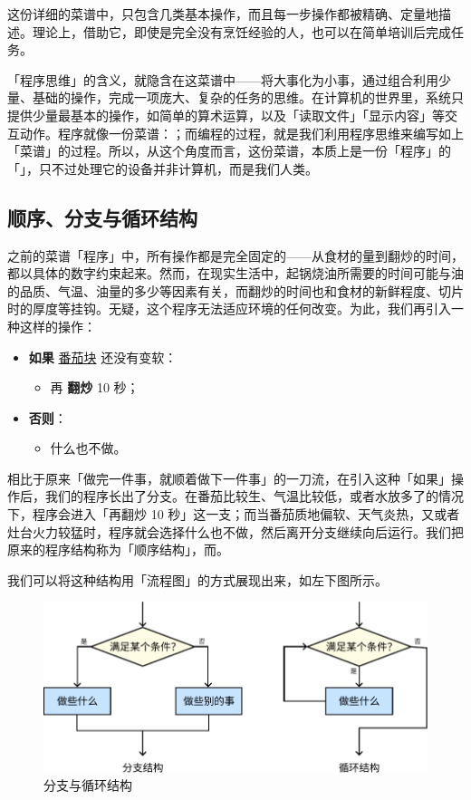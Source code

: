 这份详细的菜谱中，只包含几类基本操作，而且每一步操作都被精确、定量地描述。理论上，借助它，即使是完全没有烹饪经验的人，也可以在简单培训后完成任务。

「程序思维」的含义，就隐含在这菜谱中——将大事化为小事，通过组合利用少量、基础的操作，完成一项庞大、复杂的任务的思维。在计算机的世界里，系统只提供少量最基本的操作，如简单的算术运算，以及「读取文件」「显示内容」等交互动作。程序就像一份菜谱：；而编程的过程，就是我们利用程序思维来编写如上「菜谱」的过程。所以，从这个角度而言，这份菜谱，本质上是一份「程序」的「」，只不过处理它的设备并非计算机，而是我们人类。

\subsection{顺序、分支与循环结构}

之前的菜谱「程序」中，所有操作都是完全固定的——从食材的量到翻炒的时间，都以具体的数字约束起来。然而，在现实生活中，起锅烧油所需要的时间可能与油的品质、气温、油量的多少等因素有关，而翻炒的时间也和食材的新鲜程度、切片时的厚度等挂钩。无疑，这个程序无法适应环境的任何改变。为此，我们再引入一种这样的操作：

\begin{itemize}
  \item \textbf{如果} \underline{番茄块} 还没有变软：
    \begin{itemize}
      \item 再 \textbf{翻炒} 10 秒；
    \end{itemize}
  \item \textbf{否则}：
    \begin{itemize}
      \item 什么也不做。
    \end{itemize}
\end{itemize}

相比于原来「做完一件事，就顺着做下一件事」的一刀流，在引入这种「如果」操作后，我们的程序长出了分支。在番茄比较生、气温比较低，或者水放多了的情况下，程序会进入「再翻炒 10 秒」这一支；而当番茄质地偏软、天气炎热，又或者灶台火力较猛时，程序就会选择什么也不做，然后离开分支继续向后运行。我们把原来的程序结构称为「顺序结构」，而。

我们可以将这种结构用「流程图」的方式展现出来，如左下图所示。

\begin{figure}[htb!]
  \centering
  \includegraphics[width=.8\textwidth]{assets/surpass/Branch_and_loop.pdf}
  \caption{分支与循环结构}
  \label{fig:Branch_and_loop}
\end{figure}

